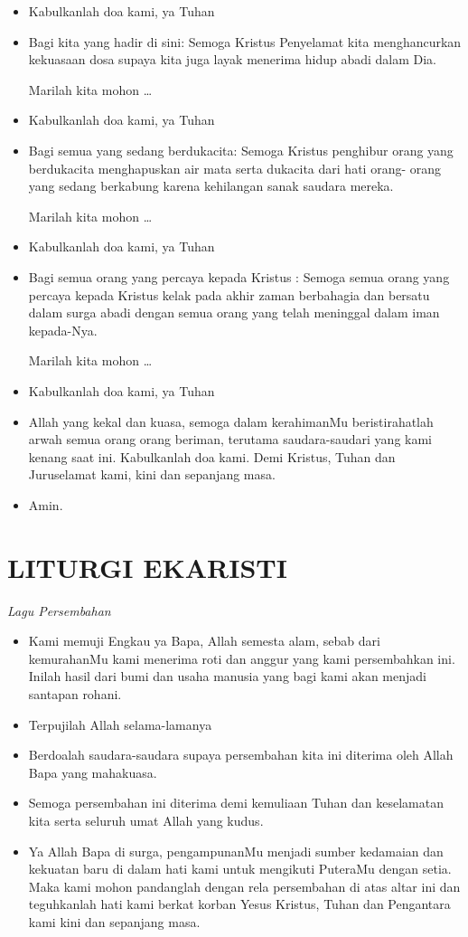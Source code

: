 \documentclass[a5paper,headsepline,titlepage,11pt,normalheadings,DIVcalc]{scrbook}
\makeatletter
\newcommand{\lagu}[1]{%
  {\parindent \z@ 
    \interlinepenalty\@M \slshape \mdseries \Large \textit{#1}\par\nobreak \vskip 10\p@ }}
\newcommand{\BU}[1]{\begin{itemize} \item[U:] #1 \end{itemize}}
\newcommand{\BI}[1]{\begin{itemize} \item[I:] #1 \end{itemize}}
\newcommand{\BP}[1]{\begin{itemize} \item[P:] #1 \end{itemize}}
\makeatother
\begin{document}
\BU{Kabulkanlah doa kami, ya Tuhan} 

\BP{Bagi kita yang hadir di sini:
Semoga Kristus Penyelamat kita menghancurkan
kekuasaan dosa supaya kita juga layak menerima hidup
abadi dalam Dia.

Marilah kita mohon \ldots}

\BU{Kabulkanlah doa kami, ya Tuhan}

\BP{Bagi semua yang sedang berdukacita:
Semoga Kristus penghibur orang yang berdukacita
menghapuskan air mata serta dukacita dari hati orang-
orang yang sedang berkabung karena kehilangan sanak
saudara mereka.

Marilah kita mohon \ldots}

\BU{Kabulkanlah doa kami, ya Tuhan}

\BP{Bagi semua orang yang percaya kepada Kristus :
Semoga semua orang yang percaya kepada Kristus kelak
pada akhir zaman berbahagia dan bersatu dalam surga
abadi dengan semua orang yang telah meninggal dalam
iman kepada-Nya.

Marilah kita mohon \ldots}

\BU{Kabulkanlah doa kami, ya Tuhan}

\BI{Allah yang kekal dan kuasa, semoga dalam kerahimanMu beristirahatlah arwah semua orang orang beriman, terutama saudara-saudari yang kami kenang saat ini. Kabulkanlah doa kami. Demi Kristus, Tuhan dan Juruselamat kami, kini dan sepanjang masa.}

\BU{Amin.}

\section*{LITURGI EKARISTI}

\lagu{Lagu Persembahan}

\BI{Kami memuji Engkau ya Bapa, Allah semesta alam, sebab 
dari kemurahanMu kami menerima roti dan anggur yang 
kami persembahkan ini. Inilah hasil dari bumi dan usaha 
manusia yang bagi kami akan menjadi santapan rohani.}

\BU{Terpujilah Allah selama-lamanya}

\BI{Berdoalah saudara-saudara supaya persembahan kita ini 
diterima oleh Allah Bapa yang mahakuasa.}

\BU{Semoga persembahan ini diterima demi kemuliaan Tuhan 
dan keselamatan kita serta seluruh umat Allah yang kudus.}

\BI{Ya Allah Bapa di surga, pengampunanMu menjadi sumber 
kedamaian dan kekuatan baru di dalam hati kami untuk 
mengikuti PuteraMu dengan setia. Maka kami mohon 
pandanglah dengan rela persembahan di atas altar ini dan 
teguhkanlah hati kami berkat korban Yesus Kristus, Tuhan 
dan Pengantara kami kini dan sepanjang masa.}
\end{document}
